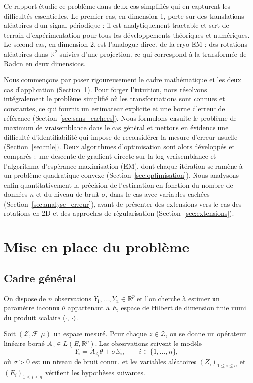 \documentclass[12pt, a4paper]{article}
\theoremstyle{definition}
\newcommand{\R}{\mathbb{R}}
\newcommand{\Zcal}{\mathcal{Z}}
\newcommand{\Fcal}{\mathcal{F}}
\newcommand{\inner}[2]{\langle #1,\, #2 \rangle}
\begin{document}
Ce rapport étudie ce problème dans deux cas simplifiés qui en capturent les
difficultés essentielles. Le premier cas, en dimension 1, porte sur des translations
aléatoires d'un signal périodique : il est analytiquement tractable et sert de
terrain d'expérimentation pour tous les développements théoriques et numériques.
Le second cas, en dimension 2, est l'analogue direct de la cryo-EM : des rotations
aléatoires dans $\mathbb{R}^2$ suivies d'une projection, ce qui correspond à la
transformée de Radon en deux dimensions.

Nous commençons par poser rigoureusement le cadre mathématique et les deux cas
d'application (Section~\ref{sec:mise_en_place}). Pour forger l'intuition, nous
résolvons intégralement le problème simplifié où les transformations sont connues et
constantes, ce qui fournit un estimateur explicite et une borne d'erreur de référence
(Section~\ref{sec:sans_cachees}). Nous formulons ensuite le problème de maximum de
vraisemblance dans le cas général et mettons en évidence une difficulté d'identifiabilité
qui impose de reconsidérer la mesure d'erreur usuelle
(Section~\ref{sec:mle}). Deux algorithmes d'optimisation sont alors développés et
comparés : une descente de gradient directe sur la log-vraisemblance et l'algorithme
d'espérance-maximisation (EM), dont chaque itération se ramène à un problème
quadratique convexe (Section~\ref{sec:optimisation}). Nous analysons enfin
quantitativement la précision de l'estimation en fonction du nombre de données $n$
et du niveau de bruit $\sigma$, dans le cas avec variables cachées
(Section~\ref{sec:analyse_erreur}), avant de présenter des extensions vers le cas
des rotations en 2D et des approches de régularisation
(Section~\ref{sec:extensions}).

\section{Mise en place du problème}
\label{sec:mise_en_place}

\subsection{Cadre général}
\label{subsec:cadre_general}

On dispose de $n$ observations $Y_1, \ldots, Y_n \in \mathbb{R}^p$ et l'on cherche
à estimer un paramètre inconnu $\theta$ appartenant à $E$, espace de Hilbert
de dimension finie muni du produit scalaire $\inner{\cdot}{\cdot}$.

Soit $(\Zcal, \Fcal, \mu)$ un espace mesuré. Pour chaque $z \in \Zcal$, on se
donne un opérateur linéaire borné $A_z \in L(E, \R^p)$. Les observations suivent
le modèle
\begin{equation}
    Y_i = A_{Z_i}\theta + \sigma E_i, \qquad i \in \{1, \ldots, n\}, \tag{M}
    \label{eq:modele}
\end{equation}
où $\sigma > 0$ est un niveau de bruit connu, et les variables aléatoires
$(Z_i)_{1 \leq i \leq n}$ et $(E_i)_{1 \leq i \leq n}$ vérifient les hypothèses suivantes.
\end{document}
